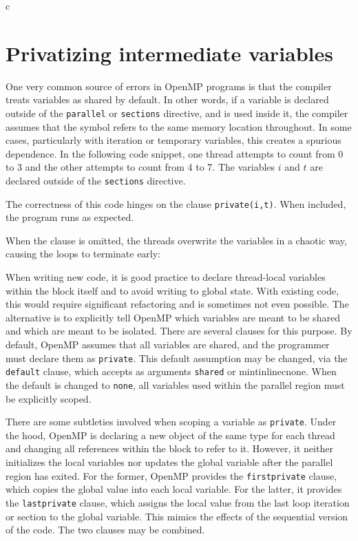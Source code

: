 \documentclass[conference, a4paper]{IEEEtran-modified}
\begin{document}
\begin{ccode}[]{c}
\section{Privatizing intermediate variables}

  One very common source of errors in OpenMP programs is that the compiler treats variables as shared by default. In other words, if a variable is declared outside of the \texttt{parallel} or \texttt{sections} directive, and is used inside it, the compiler assumes that the symbol refers to the same memory location throughout. In some cases, particularly with iteration or temporary variables, this creates a spurious dependence. In the following code snippet, one thread attempts to count from 0 to 3 and the other attempts to count from 4 to 7. The variables $i$ and $t$ are declared outside of the \texttt{sections} directive. 



  The correctness of this code hinges on the clause \texttt{private(i,t)}. When included, the program runs as expected.


  When the clause is omitted, the threads overwrite the variables in a chaotic way, causing the loops to terminate early:


  When writing new code, it is good practice to declare thread-local variables within the block itself and to avoid writing to global state. With existing code, this would require significant refactoring and is sometimes not even possible. The alternative is to explicitly tell OpenMP which variables are meant to be shared and which are meant to be isolated. There are several clauses for this purpose. By default, OpenMP assumes that all variables are shared, and the programmer must declare them as \texttt{private}. This default assumption may be changed, via the \texttt{default} clause, which accepts as arguments \texttt{shared} or  
  mintinline{c}{none}. When the default is changed to \texttt{none}, all variables used within the parallel region must be explicitly scoped. 

  There are some subtleties involved when scoping a variable as \texttt{private}. Under the hood, OpenMP is declaring a new object of the same type for each thread and changing all references within the block to refer to it. However, it neither initializes the local variables nor updates the global variable after the parallel region has exited. For the former, OpenMP provides the \texttt{firstprivate} clause, which copies the global value into each local variable. For the latter, it provides the \texttt{lastprivate} clause, which assigns the local value from the last loop iteration or section to the global variable. This mimics the effects of the sequential version of the code. The two clauses may be combined.


\end{ccode}
\end{document}
